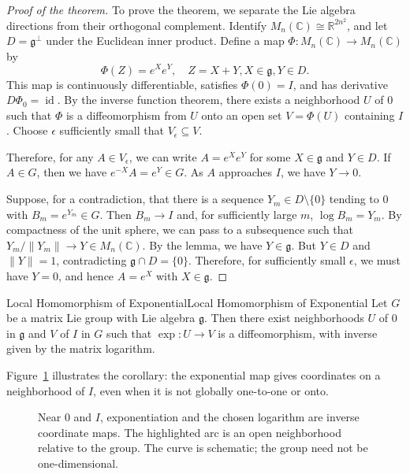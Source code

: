 \documentclass[../main.tex]{subfiles}
\begin{document}
\begin{proof}[Proof of the theorem]
To prove the theorem, we separate the Lie algebra directions from their orthogonal complement. Identify $M_n(\mathbb{C}) \cong \mathbb{R}^{2n^2}$, and let $D = \mathfrak{g}^\perp$ under the Euclidean inner product. Define a map $\Phi: M_n(\mathbb{C}) \to M_n(\mathbb{C})$ by
\begin{equation}
  \Phi(Z) = e^X e^Y, \quad Z = X + Y, X \in \mathfrak{g}, Y \in D.
\end{equation}
This map is continuously differentiable, satisfies $\Phi(0)=I$, and has derivative $D\Phi_0=\operatorname{id}$. By the inverse function theorem, there exists a neighborhood $U$ of $0$ such that $\Phi$ is a diffeomorphism from $U$ onto an open set $V = \Phi(U)$ containing $I$. Choose $\epsilon$ sufficiently small that $V_\epsilon\subseteq V$.

Therefore, for any $A \in V_\epsilon$, we can write $A = e^X e^Y$ for some $X \in \mathfrak{g}$ and $Y \in D$. If $A \in G$, then we have $e^{-X} A = e^Y \in G$. As $A$ approaches $I$, we have $Y \to 0$.

Suppose, for a contradiction, that there is a sequence $Y_m\in D\setminus\{0\}$ tending to $0$ with $B_m=e^{Y_m}\in G$. Then $B_m\to I$ and, for sufficiently large $m$, $\log B_m=Y_m$. By compactness of the unit sphere, we can pass to a subsequence such that $Y_m / \|Y_m\| \to Y \in M_n(\mathbb{C})$. By the lemma, we have $Y \in \mathfrak{g}$. But $Y\in D$ and $\|Y\|=1$, contradicting $\mathfrak{g}\cap D=\{0\}$. Therefore, for sufficiently small $\epsilon$, we must have $Y = 0$, and hence $A = e^X$ with $X \in \mathfrak{g}$.
\end{proof}

\begin{corollary}{Local Homomorphism of Exponential}{Local Homomorphism of Exponential}
  Let $G$ be a matrix Lie group with Lie algebra $\mathfrak{g}$. Then there exist neighborhoods $U$ of $0$ in $\mathfrak{g}$ and $V$ of $I$ in $G$ such that $\exp:U\to V$ is a diffeomorphism, with inverse given by the matrix logarithm.
\end{corollary}


Figure~\ref{fig:exponential-local-coordinates} illustrates the corollary: the exponential map gives coordinates on a neighborhood of $I$, even when it is not globally one-to-one or onto.

\begin{figure}[H]
    \centering
    \caption{Near $0$ and $I$, exponentiation and the chosen logarithm are inverse coordinate maps. The highlighted arc is an open neighborhood relative to the group. The curve is schematic; the group need not be one-dimensional.}
    \label{fig:exponential-local-coordinates}
\end{figure}
\end{document}
